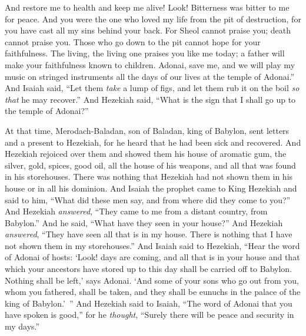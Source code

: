 \begin{biblechapter}
And restore me to health and keep me alive!
\verse Look! Bitterness was bitter to me for peace. 
And you were the one who loved my life from the pit of destruction, 
for you have cast all my sins behind your back.
\verse For Sheol cannot praise you; death cannot praise you. 
Those who go down to the pit cannot hope for your faithfulness.
\verse The living, the living one praises you like me today; 
a father will make your faithfulness known to children.
\verse Adonai, save me, and we will play my music on stringed instruments all the days of our lives at the temple of Adonai.”
\verse And Isaiah said, “Let them \textit{take} a lump of figs, and let them rub it on the boil \textit{so that} he may recover.”
\verse And Hezekiah said, “What is the sign that I shall go up to the temple of Adonai?”
\end{biblechapter}

\begin{biblechapter} %
 At that time, Merodach-Baladan, son of Baladan, king of Babylon, sent letters and a present to Hezekiah, for he heard that he had been sick and recovered.
\verse And Hezekiah rejoiced over them and showed them his house of aromatic gum, the silver, gold, spices, good oil, all the house of his weapons, and all that was found in his storehouses. There was nothing that Hezekiah had not shown them in his house or in all his dominion.
\verse And Isaiah the prophet came to King Hezekiah and said to him, “What did these men say, and from where did they come to you?” And Hezekiah \textit{answered}, “They came to me from a distant country, from Babylon.”
\verse And he said, “What have they seen in your house?” And Hezekiah \textit{answered}, “They have seen all that is in my house. There is nothing that I have not shown them in my storehouses.”
\verse And Isaiah said to Hezekiah, “Hear the word of Adonai of hosts:
\verse ‘Look! days are coming, and all that is in your house and that which your ancestors have stored up to this day shall be carried off to Babylon. Nothing shall be left,’ says Adonai.
\verse ‘And some of your sons who go out from you, whom you fathered, shall be taken, and they shall be eunuchs in the palace of the king of Babylon.’ ”
\verse And Hezekiah said to Isaiah, “The word of Adonai that you have spoken is good,” for he \textit{thought}, “Surely there will be peace and security in my days.”
\end{biblechapter}

